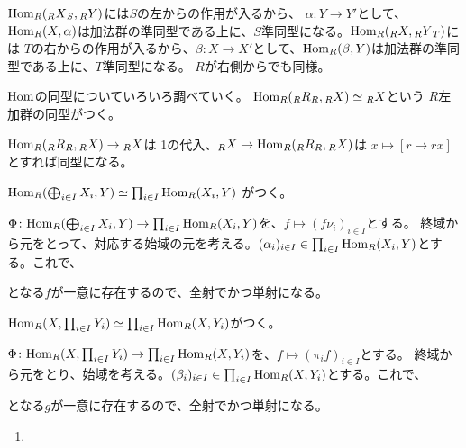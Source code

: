 \documentclass[9pt]{ltjsarticle}
\begin{document}
$\Hom_R(\Lmod{R}\Rmod{S}X,\Lmod{R}Y)$には$S$の左からの作用が入るから、
$\alpha\colon Y \to Y'$として、$\Hom_R(X,\alpha)$は加法群の準同型である上に、$S$準同型になる。$\Hom_R(\Lmod{R}X,\Lmod{R}\Rmod{T}Y)$には
$T$の右からの作用が入るから、$\beta\colon X\to X'$として、$\Hom_R(\beta,Y)$は加法群の準同型である上に、$T$準同型になる。
$R$が右側からでも同様。

$\Hom$の同型についていろいろ調べていく。
$\Hom_R(\Lmod{R}\Rmod{R}R, \Lmod{R}X) \simeq \Lmod{R}X$という
$R$左加群の同型がつく。
\begin{myproof}
  $\Hom_R(\Lmod{R}\Rmod{R}R,\Lmod{R}X) \to \Lmod{R}X$は
  1の代入、$\Lmod{R}X \to \Hom_R(\Lmod{R}\Rmod{R} R, \Lmod{R}X)$は
  $x\mapsto [r\mapsto rx]$とすれば同型になる。
\end{myproof}

$\Hom_R(\bigoplus_{i\in I}X_i, Y) \simeq \prod_{i\in I}\Hom_R(X_i,Y)$
がつく。
\begin{myproof}
  $\Phi \colon \Hom_R(\bigoplus_{i\in I}X_i, Y) \to \prod_{i\in I}\Hom_R(X_i,Y)$を、$f\mapsto (f\nu_i)_{i\in I}$とする。
  終域から元をとって、対応する始域の元を考える。$(\alpha_i)_{i\in I} \in \prod_{i\in I}\Hom_R(X_i,Y)$とする。これで、
  \begin{center}
  \end{center}
  となる$f$が一意に存在するので、全射でかつ単射になる。
\end{myproof}

$\Hom_R(X,\prod_{i\in I}Y_i) \simeq \prod_{i\in I}\Hom_R(X,Y_i)$がつく。
\begin{myproof}
$\Phi\colon \Hom_R(X,\prod_{i\in I}Y_i) \to \prod_{i\in I}\Hom_R(X,Y_i)$を、$f\mapsto (\pi_i f)_{i\in I}$とする。
終域から元をとり、始域を考える。$(\beta_i)_{i\in I}\in \prod_{i\in I}\Hom_R(X,Y_i)$とする。これで、
\begin{center}
\end{center}
となる$g$が一意に存在するので、全射でかつ単射になる。
\end{myproof}

\begin{enumerate}[label=(問題\arabic*)]
  \item

\end{enumerate}
\end{document}
